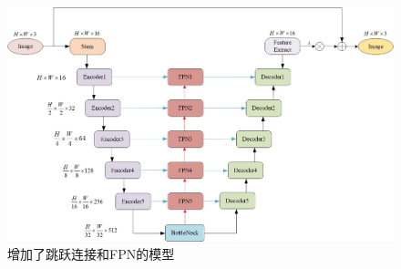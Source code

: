 \documentclass[a4paper]{ctexart}
\begin{document}
		\begin{figure}[htbp]
			\centering
			\includegraphics[width=0.7\linewidth]{picture/LLIE/My Architecture/skip_model_fpn}
			\caption{增加了跳跃连接和FPN的模型}
			\label{fig: skip model_fpn}	
		\end{figure}
		
\end{document}
